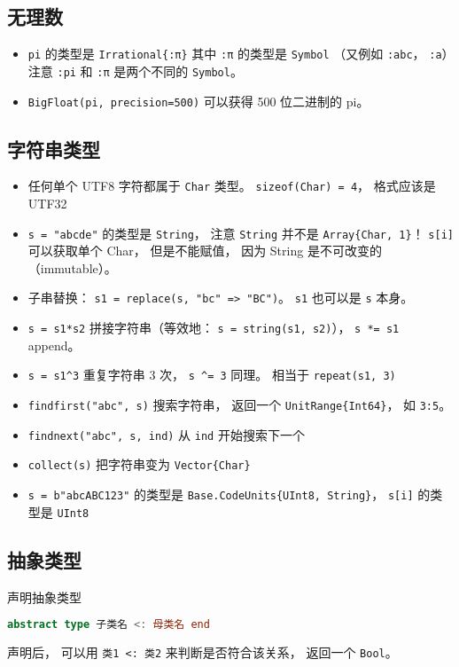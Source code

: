 \subsection{无理数}
\begin{itemize}
\item \verb|pi| 的类型是 \verb|Irrational{:π}| 其中 \verb|:π| 的类型是 \verb|Symbol| （又例如 \verb|:abc|， \verb|:a|）注意 \verb|:pi| 和 \verb|:π| 是两个不同的 \verb|Symbol|。
\item \verb|BigFloat(pi, precision=500)| 可以获得 500 位二进制的 pi。
\end{itemize}


\subsection{字符串类型}
\begin{itemize}
\item 任何单个 UTF8 字符都属于 \verb|Char| 类型。 \verb|sizeof(Char) = 4|， 格式应该是 UTF32
\item \verb|s = "abcde"| 的类型是 \verb|String|， 注意 \verb|String| 并不是 \verb|Array{Char, 1}|！ \verb|s[i]| 可以获取单个 Char， 但是不能赋值， 因为 String 是不可改变的（immutable）。
\item 子串替换： \verb|s1 = replace(s, "bc" => "BC")|。 \verb|s1| 也可以是 \verb|s| 本身。
\item \verb|s = s1*s2| 拼接字符串（等效地： \verb|s = string(s1, s2)|）， \verb|s *= s1| append。
\item \verb|s = s1^3| 重复字符串 3 次， \verb|s ^= 3| 同理。 相当于 \verb|repeat(s1, 3)|
\item \verb|findfirst("abc", s)| 搜索字符串， 返回一个 \verb|UnitRange{Int64}|， 如 \verb|3:5|。
\item \verb|findnext("abc", s, ind)| 从 \verb|ind| 开始搜索下一个
\item \verb|collect(s)| 把字符串变为 \verb|Vector{Char}|
\item \verb|s = b"abcABC123"| 的类型是 \verb|Base.CodeUnits{UInt8, String}|， \verb|s[i]| 的类型是 \verb|UInt8|
\end{itemize}


\subsection{抽象类型}
声明抽象类型
\begin{lstlisting}[language=julia]
abstract type 子类名 <: 母类名 end
\end{lstlisting}
声明后， 可以用 \verb|类1 <: 类2| 来判断是否符合该关系， 返回一个 \verb|Bool|。

